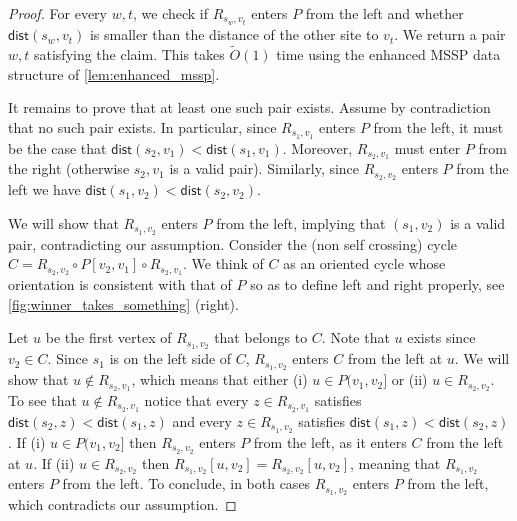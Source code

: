 \documentclass{article}
\newcommand{\dist}{\mathsf{dist}}
\newcommand{\Otild}{\tilde{O}}
\begin{document}
    \begin{proof}
        For every $w,t$, we check if $R_{s_w,v_t}$ enters $P$ from the left and whether $\dist(s_w,v_t)$ is smaller than the distance of the other site to $v_t$.
        We return a pair $w,t$ satisfying the claim.
        This takes $\Otild(1)$ time using the enhanced MSSP data structure of \cref{lem:enhanced_mssp}.

        It remains to prove that at least one such pair exists.
        Assume by contradiction that no such pair exists.
        In particular, since $R_{s_1,v_1}$ enters $P$ from the left, it must be the case that $\dist(s_2,v_1)<\dist(s_1,v_1)$.
        Moreover, $R_{s_2,v_1}$ must enter $P$ from the right (otherwise $s_2,v_1$ is a valid pair).
        Similarly, since $R_{s_2,v_2}$ enters $P$ from the left we have $\dist(s_1,v_2)<\dist(s_2,v_2)$.


        We will show that $R_{s_1,v_2}$ enters $P$ from the left, implying that $(s_1,v_2)$ is a valid pair, contradicting our assumption.
        Consider the (non self crossing) cycle $C =R_{s_2,v_2}\circ P[v_2,v_1]\circ R_{s_2,v_1}$.
        We think of $C$ as an oriented cycle whose orientation is consistent with that of $P$ so as to define left and right properly, see \cref{fig:winner_takes_something} (right).

        Let $u$ be the first vertex of $R_{s_1,v_2}$ that belongs to $C$.
        Note that $u$ exists since $v_2 \in C$.
        Since $s_1$ is on the left side of $C$, $R_{s_1,v_2}$ enters $C$ from the left at $u$.
        We will show that $u\notin R_{s_2,v_1}$, which means that either (i) $u\in P(v_1,v_2]$ or (ii) $u \in R_{s_2,v_2}$.
        To see that  $u\notin R_{s_2,v_1}$ notice that every $z\in R_{s_2,v_1}$ satisfies $\dist(s_2,z)<\dist(s_1,z)$ and every $z\in R_{s_1,v_2}$ satisfies $\dist(s_1,z)<\dist(s_2,z)$.
        If (i) $u \in P(v_1,v_2]$  then $R_{s_2,v_2}$ enters $P$ from the left, as it enters $C$ from the left at $u$.
        If (ii) $u \in R_{s_2,v_2}$ then $R_{s_1,v_2}[u,v_2]=R_{s_2,v_2}[u,v_2]$, meaning that $R_{s_1,v_2}$ enters $P$ from the left.
        To conclude, in both cases $R_{s_1,v_2}$ enters $P$ from the left, which contradicts our assumption.
        \qedhere







    \end{proof}
\end{document}
